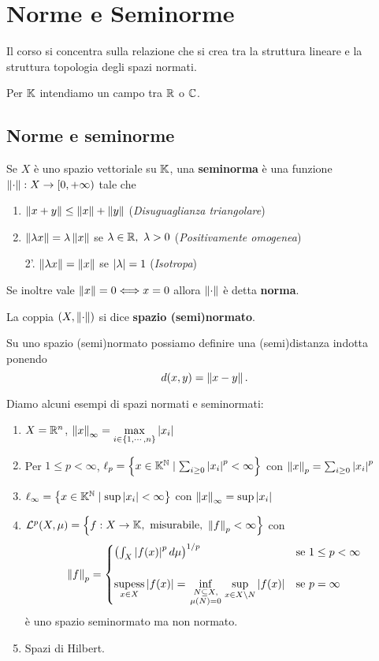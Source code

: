 \chapter{Norme e Seminorme}
Il corso si concentra sulla relazione che si crea tra la struttura lineare e la struttura topologia degli spazi normati. 

Per $\mathbb{K}$ intendiamo un campo tra $\mathbb{R}$ o $\mathbb{C}$.

\section{Norme e seminorme}

\begin{definition}[Seminorma]
Se $X$ \`e uno spazio vettoriale su $\mathbb{K}$, una \textbf{seminorma} \`e una funzione ${\left\Vert{\cdot}\right\Vert}:X\to [0,+\infty)$ tale che
\begin{enumerate}
    \item $\left\Vert{x+y}\right\Vert\leq \left\Vert{x}\right\Vert+\left\Vert{y}\right\Vert$ (\textit{Disuguaglianza triangolare})
    \item $\left\Vert{\lambda x}\right\Vert=\lambda\left\Vert{x}\right\Vert$ se $\lambda\in\mathbb{R},\ \lambda>0$ (\textit{Positivamente omogenea})
    \item[2'.] $\left\Vert{\lambda x}\right\Vert=\left\Vert{x}\right\Vert$ se $|\lambda|=1$ (\textit{Isotropa})
\end{enumerate}
Se inoltre vale $\left\Vert{x}\right\Vert=0\Longleftrightarrow x=0$ allora $\left\Vert{\cdot}\right\Vert$ \`e detta \textbf{norma}.

La coppia $(X,\left\Vert{\cdot}\right\Vert)$ si dice \textbf{spazio (semi)normato}.
\end{definition}
\begin{remark}
Su uno spazio (semi)normato possiamo definire una (semi)distanza indotta ponendo
\[d(x,y)=\left\Vert{x-y}\right\Vert.\]
\end{remark}

Diamo alcuni esempi di spazi normati e seminormati:
\begin{example}
\begin{enumerate}
    \item $X=\mathbb{R}^n$, $\displaystyle \left\Vert{x}\right\Vert_\infty=\max_{i\in\left\{{1,\cdots,n}\right\}} \left|{x_i}\right|$
    \item Per $1\leq p<\infty$, $\ell_p=\left\{{x\in\mathbb{K}^{\mathbb{N}}\mid \sum_{i\geq 0}\left|{x_i}\right|^p<\infty}\right\}$ con $\left\Vert{x}\right\Vert_p=\sum_{i\geq 0}\left|{x_i}\right|^p$
    \item $\ell_\infty=\left\{{x\in\mathbb{K}^{\mathbb{N}}\mid \sup\left|{x_i}\right|<\infty}\right\}$ con $\left\Vert{x}\right\Vert_\infty=\sup\left|{x_i}\right|$
    \item $\mathcal{L}^p(X,\mu)=\left\{{f:X\to\mathbb{K},\text{ misurabile, }\left\Vert{f}\right\Vert_p<\infty}\right\}$ con
    \[\left\Vert{f}\right\Vert_p=\begin{cases}
        \left({\int_X\left|{f(x)}\right|^pd\mu}\right)^{1/p} &\text{se }1\leq p<\infty\\\\
        \displaystyle \operatorname*{supess}_{x\in X}\left|{f(x)}\right|=\inf_{\begin{smallmatrix}N\subseteq X,\\ \mu(N)=0\end{smallmatrix}}\sup_{x\in X\setminus N}\left|{f(x)}\right| &\text{se }p=\infty
    \end{cases}\]
    \`e uno spazio seminormato ma non normato. 
    \item Spazi di Hilbert.
\end{enumerate}
\end{example}

